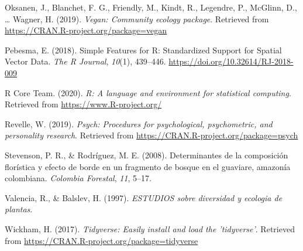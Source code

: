 \documentclass[11pt,]{article}
\begin{document}
\hypertarget{ref-VeganPack}{}
Oksanen, J., Blanchet, F. G., Friendly, M., Kindt, R., Legendre, P.,
McGlinn, D., \ldots{} Wagner, H. (2019). \emph{Vegan: Community ecology
package}. Retrieved from \url{https://CRAN.R-project.org/package=vegan}

\hypertarget{ref-sfpackage}{}
Pebesma, E. (2018). Simple Features for R: Standardized Support for
Spatial Vector Data. \emph{The R Journal}, \emph{10}(1), 439--446.
\url{https://doi.org/10.32614/RJ-2018-009}

\hypertarget{ref-RSoft}{}
R Core Team. (2020). \emph{R: A language and environment for statistical
computing}. Retrieved from \url{https://www.R-project.org/}

\hypertarget{ref-psych}{}
Revelle, W. (2019). \emph{Psych: Procedures for psychological,
psychometric, and personality research}. Retrieved from
\url{https://CRAN.R-project.org/package=psych}

\hypertarget{ref-stevenson2008determinantes}{}
Stevenson, P. R., \& Rodríguez, M. E. (2008). Determinantes de la
composición florística y efecto de borde en un fragmento de bosque en el
guaviare, amazonía colombiana. \emph{Colombia Forestal}, \emph{11},
5--17.

\hypertarget{ref-valenciaestudios}{}
Valencia, R., \& Balslev, H. (1997). \emph{ESTUDIOS sobre diversidad y
ecologia de plantas}.

\hypertarget{ref-Tidyverse}{}
Wickham, H. (2017). \emph{Tidyverse: Easily install and load the
'tidyverse'}. Retrieved from
\url{https://CRAN.R-project.org/package=tidyverse}




\newpage
\singlespacing 
\end{document}
